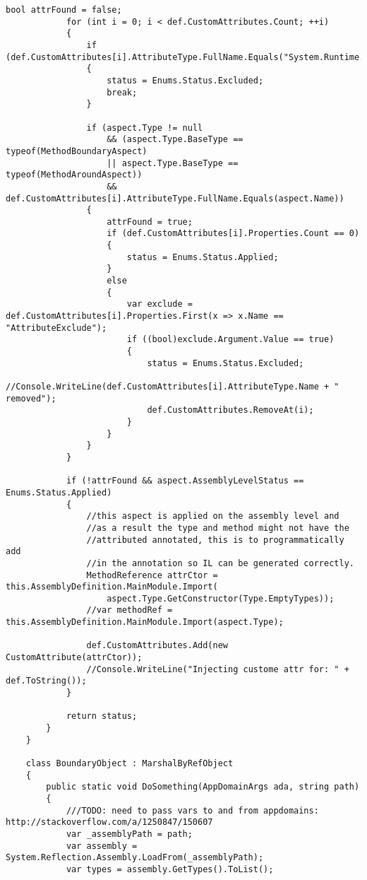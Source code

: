 \begin{lstlisting}[caption={../buffalo/Weaver.cs}, label=../buffalo/Weaver.cs, frame=tb, basicstyle=\scriptsize]
            bool attrFound = false;
            for (int i = 0; i < def.CustomAttributes.Count; ++i)
            {
                if (def.CustomAttributes[i].AttributeType.FullName.Equals("System.Runtime.CompilerServices.CompilerGeneratedAttribute"))
                {
                    status = Enums.Status.Excluded;
                    break;
                }

                if (aspect.Type != null 
                    && (aspect.Type.BaseType == typeof(MethodBoundaryAspect)
                    || aspect.Type.BaseType == typeof(MethodAroundAspect))
                    && def.CustomAttributes[i].AttributeType.FullName.Equals(aspect.Name))
                {
                    attrFound = true;
                    if (def.CustomAttributes[i].Properties.Count == 0)
                    {
                        status = Enums.Status.Applied;
                    }
                    else
                    {
                        var exclude = def.CustomAttributes[i].Properties.First(x => x.Name == "AttributeExclude");
                        if ((bool)exclude.Argument.Value == true)
                        {
                            status = Enums.Status.Excluded;
                            //Console.WriteLine(def.CustomAttributes[i].AttributeType.Name + " removed");
                            def.CustomAttributes.RemoveAt(i);
                        }
                    }
                }
            }

            if (!attrFound && aspect.AssemblyLevelStatus == Enums.Status.Applied)
            {
                //this aspect is applied on the assembly level and
                //as a result the type and method might not have the
                //attributed annotated, this is to programmatically add
                //in the annotation so IL can be generated correctly.
                MethodReference attrCtor = this.AssemblyDefinition.MainModule.Import(
                    aspect.Type.GetConstructor(Type.EmptyTypes));
                //var methodRef = this.AssemblyDefinition.MainModule.Import(aspect.Type);
                
                def.CustomAttributes.Add(new CustomAttribute(attrCtor));
                //Console.WriteLine("Injecting custome attr for: " + def.ToString());
            }

            return status;
        }
    }

    class BoundaryObject : MarshalByRefObject
    {
        public static void DoSomething(AppDomainArgs ada, string path)
        {
            ///TODO: need to pass vars to and from appdomains: http://stackoverflow.com/a/1250847/150607
            var _assemblyPath = path;
            var assembly = System.Reflection.Assembly.LoadFrom(_assemblyPath);
            var types = assembly.GetTypes().ToList();


\end{lstlisting}
